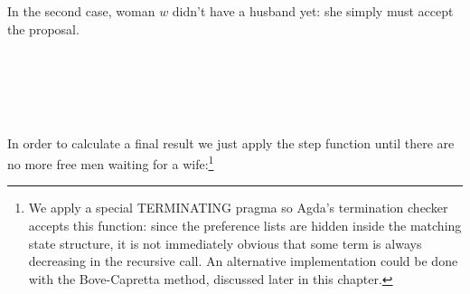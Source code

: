 {\begin{code}
%
\>[28]\<%
\end{code}
In the second case, woman $w$ didn't have a husband yet: she simply must accept the proposal.
\begin{code}%
\>[0]%
\>[880I]\AgdaSymbol{(}\AgdaSpace{}%
\AgdaSpace{}%
\AgdaSymbol{((}\AgdaSpace{}%
\AgdaOperator{\AgdaInductiveConstructor{,}}\AgdaSpace{}%
\AgdaSpace{}%
\AgdaSpace{}%
\AgdaSymbol{)}\AgdaSpace{}%
\AgdaSpace{}%
\AgdaSymbol{)}\AgdaSpace{}%
\AgdaSpace{}%
\AgdaSpace{}%
\AgdaSpace{}%
\AgdaSpace{}%
\AgdaSymbol{)}\<%
\\
\>[.][@{}l@{}]\<[880I]%
\>[5]\AgdaSymbol{|}\AgdaSpace{}%
\<%
\\
%
\>[5]\AgdaSymbol{=}\AgdaSpace{}%
%
\>[896I]\AgdaSpace{}%
\AgdaSpace{}%
\AgdaSymbol{((}\AgdaSpace{}%
\AgdaOperator{\AgdaInductiveConstructor{,}}\AgdaSpace{}%
\AgdaSymbol{)}\AgdaSpace{}%
\AgdaSpace{}%
\AgdaSymbol{)}\AgdaSpace{}%
\<%
\\
\>[.][@{}l@{}]\<[896I]%
\>[15]\AgdaSymbol{(}\AgdaSpace{}%
\AgdaSymbol{(}\AgdaSpace{}%
\AgdaOperator{\AgdaInductiveConstructor{,}}\AgdaSpace{}%
\AgdaSymbol{)}\AgdaSpace{}%
\AgdaSymbol{)}\<%
\\
%
\>[15]\AgdaSymbol{(}\AgdaSpace{}%
\AgdaSpace{}%
\AgdaSymbol{((}\AgdaSpace{}%
\AgdaOperator{\AgdaInductiveConstructor{,}}\AgdaSpace{}%
\AgdaSymbol{)}\AgdaSpace{}%
\AgdaSpace{}%
\AgdaSymbol{))}\AgdaSpace{}%
\<%
\end{code}

In order to calculate a final result we just apply the step function until there are no more free men waiting for a wife:\footnote{We apply a special TERMINATING pragma so Agda's termination checker accepts this function: since the preference lists are hidden inside the matching state structure, it is not immediately obvious that some term is always decreasing in the recursive call. An alternative implementation could be done with the Bove-Capretta method, discussed later in this chapter.}

}
